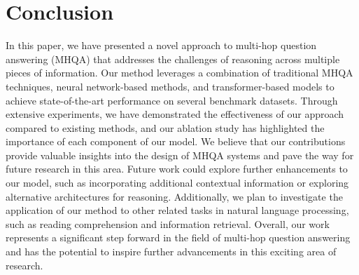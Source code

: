 \section{Conclusion}
\label{conclusion}
In this paper, we have presented a novel approach to multi-hop question answering (MHQA) that addresses the challenges of reasoning across multiple pieces of information. Our method leverages a combination of traditional MHQA techniques, neural network-based methods, and transformer-based models to achieve state-of-the-art performance on several benchmark datasets. Through extensive experiments, we have demonstrated the effectiveness of our approach compared to existing methods, and our ablation study has highlighted the importance of each component of our model. We believe that our contributions provide valuable insights into the design of MHQA systems and pave the way for future research in this area. Future work could explore further enhancements to our model, such as incorporating additional contextual information or exploring alternative architectures for reasoning. Additionally, we plan to investigate the application of our method to other related tasks in natural language processing, such as reading comprehension and information retrieval. Overall, our work represents a significant step forward in the field of multi-hop question answering and has the potential to inspire further advancements in this exciting area of research.